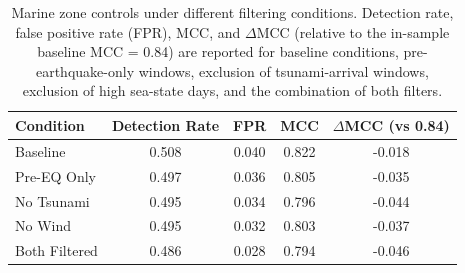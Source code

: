 \documentclass[preprint,review,12pt,authoryear]{elsarticle}
\begin{document}
\begin{table}[p]
\footnotesize
\centering
\caption{Marine zone controls under different filtering conditions. Detection rate, false positive rate (FPR), MCC, and $\Delta$MCC (relative to the in-sample baseline MCC = 0.84) are reported for baseline conditions, pre-earthquake-only windows, exclusion of tsunami-arrival windows, exclusion of high sea-state days, and the combination of both filters.}
\label{tab:tableS3}
\begin{tabular}{@{}lcccc@{}}
\toprule
Condition      & Detection Rate & FPR   & MCC   & $\Delta$MCC (vs 0.84) \\
\midrule
Baseline       & 0.508          & 0.040 & 0.822 & -0.018                \\
Pre-EQ Only    & 0.497          & 0.036 & 0.805 & -0.035                \\
No Tsunami     & 0.495          & 0.034 & 0.796 & -0.044                \\
No Wind        & 0.495          & 0.032 & 0.803 & -0.037                \\
Both Filtered  & 0.486          & 0.028 & 0.794 & -0.046                \\
\bottomrule
\end{tabular}
\end{table}
\clearpage

\begin{table}[p]
\footnotesize
\centering
\caption{Stratified performance (2$\times$2) by magnitude and depth for M$\ge$7.0 earthquakes. We report MCC and FPR with 95\% confidence intervals (CI). $\Delta$ values are computed relative to the overall mean (window-weighted) performance (MCC = 0.804; FPR = 0.038).}
\label{tab:tableS4}
\end{table}
\clearpage
\end{document}
